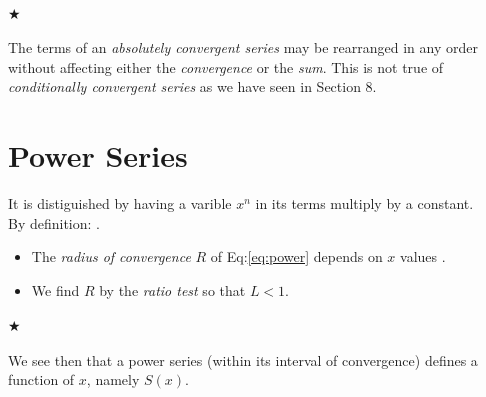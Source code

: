             \paragraph{$\bigstar$}
                The terms of an \textit{absolutely convergent series} may be rearranged in 
                any order without affecting either the \textit{convergence} or the \textit{sum}. This is not 
                true of \textit{conditionally convergent series} as we have seen in Section 8.

        \section{Power Series}
            It is distiguished by having a varible $x^n$ in its terms multiply by a constant.\\
            By definition: .
            \begin{itemize}
                \item The \textit{radius of convergence} $R$ of Eq:\ref{eq:power} depends on $x$ values .
                \item We find $R$ by the \textit{ratio test} so that $L<1$.
            \end{itemize}

        \paragraph{$\bigstar$}
            We see then that a power series (within its interval of convergence) defines a 
            function of $x$, namely $S(x)$.

